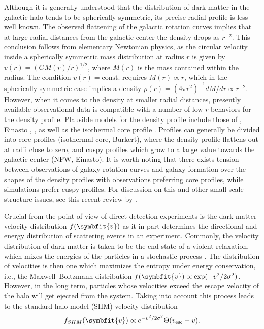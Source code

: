 \documentclass[b5paper, 10pt, twoside]{book}
\renewcommand{\vec}[1]{\symbfit{#1}}
\begin{document}
Although it is generally understood that the distribution of dark matter in the galactic halo tends to be spherically symmetric, its precise radial profile is less well known. The observed flattening of the galactic rotation curves implies that at large radial distances from the galactic center the density drops as $r^{-2}$. This conclusion follows from elementary Newtonian physics, as the circular velocity inside a spherically symmetric mass distribution at radius $r$ is given by $v(r)=(GM(r)/r)^{1/2}$, where $M(r)$ is the mass contained within the radius. The condition $v(r)=\text{const.}$ requires $M(r)\propto r$, which in the spherically symmetric case implies a density $\rho(r)=(4\pi r^2)^{-1}dM/dr\propto r^{-2}$. However, when it comes to the density at smaller radial distances, presently available observational data is compatible with a number of low-$r$ behaviors for the density profile. Plausible models for the density profile include those of \textcite{NavarroFrenkWhite1996}, Einasto \parencites{Einasto1965, MerrittEtAl2006}, \textcite{Burkert1995}, as well as the isothermal core profile \parencites{BahcallSoneira1980, BegemanBroeilsSanders1991}. Profiles can generally be divided into core profiles (isothermal core, Burkert), where the density profile flattens out at radii close to zero, and cuspy profiles which grow to a large value towards the galactic center (NFW, Einasto). It is worth noting that there exists tension between observations of galaxy rotation curves and galaxy formation over the shapes of the density profiles with observations preferring core profiles, while simulations prefer cuspy profiles. For discussion on this and other small scale structure issues, see this recent review by \textcite{TulinYu2018}.

Crucial from the point of view of direct detection experiments is the dark matter velocity distribution $f(\vec{v})$ as it in part determines the directional and energy distribution of scattering events in an experiment. Commonly, the velocity distribution of dark matter is taken to be the end state of a violent relaxation, which mixes the energies of the particles in a stochastic process \parencite{LyndenBell1967}. The distribution of velocities is then one which maximizes the entropy under energy conservation, i.e., the Maxwell--Boltzmann distribution $f(\vec{v})\propto \exp(-v^2/2\sigma^2)$. However, in the long term, particles whose velocities exceed the escape velocity of the halo will get ejected from the system. Taking into account this process leads to the standard halo model (SHM) velocity distribution
\begin{equation}
    f_{SHM}(\vec{v})\propto e^{-v^2/2\sigma^2}\Theta(v_\text{esc}-v).
    \label{eq:shm-dist}
\end{equation}
\end{document}
